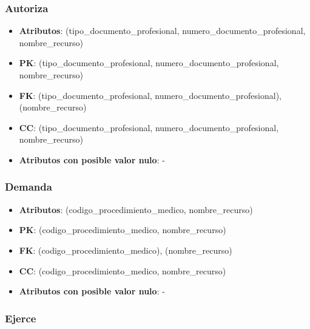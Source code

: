 \documentclass[a4paper,11pt]{article}
\begin{document}
\subsubsection{\textbf{Autoriza}}

\begin{itemize}

\item 
\textbf{Atributos}: (tipo\_documento\_profesional, numero\_documento\_profesional, nombre\_recurso)

\item 
\textbf{PK}: (tipo\_documento\_profesional, numero\_documento\_profesional, nombre\_recurso)

\item
\textbf{FK}: (tipo\_documento\_profesional, numero\_documento\_profesional), (nombre\_recurso)

\item 
\textbf{CC}: (tipo\_documento\_profesional, numero\_documento\_profesional, nombre\_recurso)

\item 
\textbf{Atributos con posible valor nulo}: -

\end{itemize}
\subsubsection{\textbf{Demanda}}

\begin{itemize}

\item 
\textbf{Atributos}: (codigo\_procedimiento\_medico, nombre\_recurso)

\item 
\textbf{PK}: (codigo\_procedimiento\_medico, nombre\_recurso)

\item
\textbf{FK}: (codigo\_procedimiento\_medico), (nombre\_recurso) 

\item 
\textbf{CC}: (codigo\_procedimiento\_medico, nombre\_recurso)

\item 
\textbf{Atributos con posible valor nulo}: -

\end{itemize}


\subsubsection{\textbf{Ejerce}}
\end{document}
